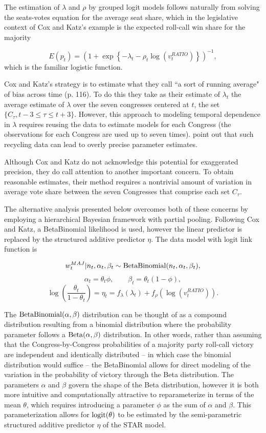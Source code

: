 The estimation of $\lambda$ and $\rho$ by grouped logit models follows naturally from solving the seats-votes equation for the average seat share, which in the legislative context of Cox and Katz's example is the expected roll-call win share for the majority 

\begin{equation*}
  E(p_t)  = \left(1 + \exp{\left\{- \lambda_t - \rho_t \log{\left( v_t^{RATIO}  \right)}\right\}}\right)^{-1},
\end{equation*}
%
\noindent which is the familiar logistic function. 

Cox and Katz's strategy is to estimate what they call ``a sort of running average" of bias across time (p. 116). To do this they take as their estimate of $\lambda_t$ the average estimate of $\lambda$ over the seven congresses centered at $t$, the set $\{C_\tau, t-3 \leq \tau \leq t+3\}$. However, this approach to modeling temporal dependence in $\lambda$ requires reusing the data to estimate models for each Congress (the observations for each Congress are used up to seven times).   point out that such recycling data can lead to overly precise parameter estimates. 

Although Cox and Katz do not acknowledge this potential for exaggerated precision, they do call attention to another important concern. To obtain reasonable estimates, their method requires a nontrivial amount of variation in average vote share between the seven Congresses that comprise each set $C_\tau$. 

The alternative analysis presented below overcomes both of these concerns by employing a hierarchical Bayesian framework with partial pooling. Following Cox and Katz, a BetaBinomial likelihood is used, however the linear predictor is replaced by the structured additive predictor $\eta$. The data model with logit link function is 

$$w_t^{MAJ} | n_t, \alpha_t, \beta_t \sim {\rm BetaBinomial}(n_t, \alpha_t, \beta_t),$$
$$ \alpha_t = \theta_t \phi, \qquad \beta_t = \theta_t (1 - \phi),$$
$$ \log\left({\frac{\theta_t}{1 - \theta_t}}\right) = \eta_t = f_{\lambda}(\lambda_t) + f_\rho \left(\log{(v_t^{RATIO})}\right).$$

The ${\rm BetaBinomial}(\alpha,\beta)$ distribution can be thought of as a compound distribution resulting from a binomial distribution where the probability parameter follows a ${\rm Beta}(\alpha,\beta)$ distribution. In other words, rather than assuming that the Congress-by-Congress probabilities of a majority party roll-call victory are independent and identically distributed -- in which case the binomial distribution would suffice -- the BetaBinomial  allows for direct modeling of the variation in the probability of victory through the Beta distribution. The parameters $\alpha$ and $\beta$ govern the shape of the Beta distribution, however it is both more intuitive and computationally attractive to reparameterize in terms of the mean $\theta$, which requires introducing a parameter $\phi$ as the sum of $\alpha$ and $\beta$.  This parameterization allows for ${\rm logit}(\theta)$ to be estimated by the semi-parametric structured additive predictor $\eta$ of the STAR model. 

